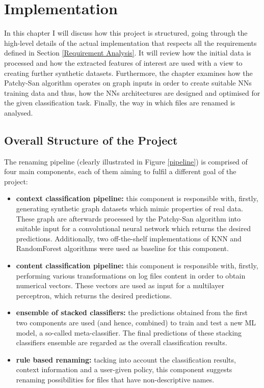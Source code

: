 

\chapter{Implementation}

In this chapter I will discuss how this project is structured, going through the high-level details of the actual implementation that respects all the requirements defined in Section \ref{Requirement Analysis}. It will review how the initial data is processed and how the extracted features of interest are used with a view to creating further synthetic datasets. Furthermore, the chapter examines how the Patchy-San algorithm operates on graph inputs in order to create suitable NNs training data and thus, how the NNs architectures are designed and optimised for the given classification task. Finally, the way in which files are renamed is analysed. 



\section{Overall Structure of the Project}

The renaming pipeline (clearly illustrated in Figure \ref{pipeline}) is comprised of four main components, each of them aiming to fulfil a different goal of the project:

\begin{itemize}
    \item \textbf{context classification pipeline:} this component is responsible with, firstly, generating synthetic graph datasets which mimic properties of real data. These graph are afterwards processed by the Patchy-San algorithm into suitable input for a convolutional neural network  which returns the desired predictions. Additionally, two off-the-shelf implementations of KNN and RandomForest algorithms were used as baseline for this component. 

    \item \textbf{content classification pipeline:} this component is responsible with, firstly, performing various transformations on log files content in order to obtain numerical vectors. These vectors are used as input for a multilayer perceptron, which returns the desired predictions.
    
    \item \textbf{ensemble of stacked classifiers:} the predictions obtained from the first two components are used (and hence, combined) to train and test a new ML model, a so-called meta-classifier. The final predictions of these stacking classifiers ensemble are regarded as the overall classification results. 
    
    \item \textbf{rule based renaming:} tacking into account the classification results, context information and a user-given policy, this component suggests renaming possibilities for files that have non-descriptive names. 
    
\end{itemize}

